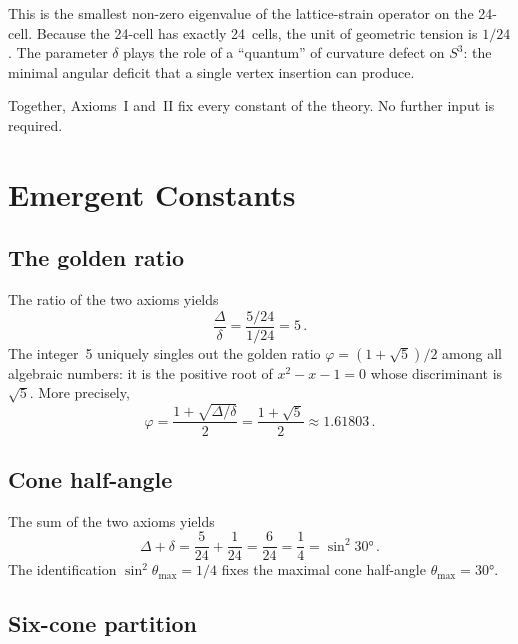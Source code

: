 \documentclass[amsmath,amssymb,aps,prd,twocolumn,superscriptaddress,nofootinbib]{revtex4-2}
\begin{document}
This is the smallest non-zero eigenvalue of the lattice-strain operator on the
24-cell.  Because the 24-cell has exactly 24~cells, the unit of geometric
tension is $1/24$.  The parameter $\delta$ plays the role of a ``quantum'' of
curvature defect on $S^3$: the minimal angular deficit that a single vertex
insertion can produce.

Together, Axioms~I and~II fix every constant of the theory.  No further input
is required.

\section{Emergent Constants}\label{sec:emergent}

\subsection{The golden ratio}

The ratio of the two axioms yields
\begin{equation}\label{eq:ratio}
  \frac{\Delta}{\delta} = \frac{5/24}{1/24} = 5\,.
\end{equation}
The integer~5 uniquely singles out the golden ratio $\varphi = (1+\sqrt{5})/2$
among all algebraic numbers: it is the positive root of $x^2 - x - 1 = 0$
whose discriminant is~$\sqrt{5}$.  More precisely,
\begin{equation}\label{eq:phi}
  \varphi = \frac{1 + \sqrt{\Delta/\delta}}{2}
           = \frac{1 + \sqrt{5}}{2} \approx 1.61803\,.
\end{equation}

\subsection{Cone half-angle}

The sum of the two axioms yields
\begin{equation}\label{eq:sum}
  \Delta + \delta = \frac{5}{24} + \frac{1}{24} = \frac{6}{24}
                  = \frac{1}{4} = \sin^2 30°\,.
\end{equation}
The identification $\sin^2\theta_{\max} = 1/4$ fixes the maximal cone
half-angle $\theta_{\max} = 30°$.

\subsection{Six-cone partition}
\end{document}
